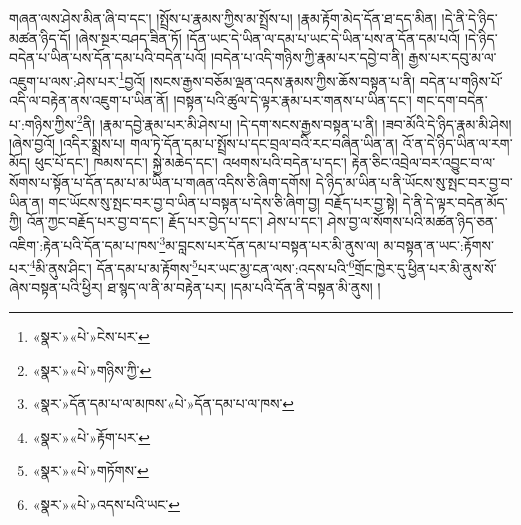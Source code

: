 གཞན་ལས་ཤེས་མིན་ཞི་བ་དང་། །སྤྲོས་པ་རྣམས་ཀྱིས་མ་སྤྲོས་པ། །རྣམ་རྟོག་མེད་དོན་ཐ་དད་མིན། །དེ་ནི་དེ་ཉིད་མཚན་ཉིད་དོ། །ཞེས་སྔར་བཤད་ཟིན་ཏོ། །དོན་ཡང་དེ་ཡིན་ལ་དམ་པ་ཡང་དེ་ཡིན་པས་ན་དོན་དམ་པའོ། །དེ་ཉིད་བདེན་པ་ཡིན་པས་དོན་དམ་པའི་བདེན་པའོ། །བདེན་པ་འདི་གཉིས་ཀྱི་རྣམ་པར་དབྱེ་བ་ནི། རྒྱས་པར་དབུ་མ་ལ་འཇུག་པ་ལས་:ཤེས་པར་\footnote{«སྣར་»«པེ་»ངེས་པར་}བྱའོ། །སངས་རྒྱས་བཅོམ་ལྡན་འདས་རྣམས་ཀྱིས་ཆོས་བསྟན་པ་ནི། བདེན་པ་གཉིས་པོ་འདི་ལ་བརྟེན་ནས་འཇུག་པ་ཡིན་ནོ། །བསྟན་པའི་ཚུལ་དེ་ལྟར་རྣམ་པར་གནས་པ་ཡིན་དང་། གང་དག་བདེན་པ་:གཉིས་ཀྱིས་\footnote{«སྣར་»«པེ་»གཉིས་ཀྱི་}ནི། །རྣམ་དབྱེ་རྣམ་པར་མི་ཤེས་པ། །དེ་དག་སངས་རྒྱས་བསྟན་པ་ནི། །ཟབ་མོའི་དེ་ཉིད་རྣམ་མི་ཤེས། །ཞེས་བྱའོ། །འདིར་སྨྲས་པ། གལ་ཏེ་དོན་དམ་པ་སྤྲོས་པ་དང་བྲལ་བའི་རང་བཞིན་ཡིན་ན། འོ་ན་དེ་ཉིད་ཡིན་ལ་རག་མོད། ཕུང་པོ་དང་། ཁམས་དང་། སྐྱེ་མཆེད་དང་། འཕགས་པའི་བདེན་པ་དང་། རྟེན་ཅིང་འབྲེལ་བར་འབྱུང་བ་ལ་སོགས་པ་སྟོན་པ་དོན་དམ་པ་མ་ཡིན་པ་གཞན་འདིས་ཅི་ཞིག་དགོས། དེ་ཉིད་མ་ཡིན་པ་ནི་ཡོངས་སུ་སྤང་བར་བྱ་བ་ཡིན་ན། གང་ཡོངས་སུ་སྤང་བར་བྱ་བ་ཡིན་པ་བསྟན་པ་དེས་ཅི་ཞིག་བྱ། བརྗོད་པར་བྱ་སྟེ། དེ་ནི་དེ་ལྟར་བདེན་མོད་ཀྱི། འོན་ཀྱང་བརྗོད་པར་བྱ་བ་དང་། རྗོད་པར་བྱེད་པ་དང་། ཤེས་པ་དང་། ཤེས་བྱ་ལ་སོགས་པའི་མཚན་ཉིད་ཅན་འཇིག་:རྟེན་པའི་དོན་དམ་པ་ཁས་\footnote{«སྣར་»དོན་དམ་པ་ལ་མཁས་«པེ་»དོན་དམ་པ་ལ་ཁས་}མ་བླངས་པར་དོན་དམ་པ་བསྟན་པར་མི་ནུས་ལ། མ་བསྟན་ན་ཡང་:རྟོགས་པར་\footnote{«སྣར་»«པེ་»རྟོག་པར་}མི་ནུས་ཤིང་། དོན་དམ་པ་མ་རྟོགས་\footnote{«སྣར་»«པེ་»གཏོགས་}པར་ཡང་མྱ་ངན་ལས་:འདས་པའི་\footnote{«སྣར་»«པེ་»འདས་པའི་ཡང་}གྲོང་ཁྱེར་དུ་ཕྱིན་པར་མི་ནུས་སོ་ཞེས་བསྟན་པའི་ཕྱིར། ཐ་སྙད་ལ་ནི་མ་བརྟེན་པར། །དམ་པའི་དོན་ནི་བསྟན་མི་ནུས། །
